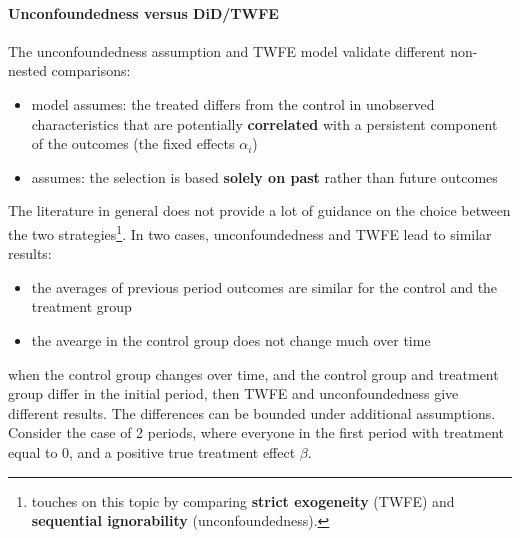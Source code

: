 \documentclass[twoside]{article}
\begin{document}
\paragraph{Unconfoundedness versus DiD/TWFE}
The unconfoundedness assumption and TWFE model validate different non-nested comparisons:
\begin{itemize}
    \item {} model assumes: the treated differs from the control in unobserved characteristics that are potentially \textbf{correlated} with a persistent component of the outcomes (the fixed effects $\alpha_i$)
    \item {} assumes: the selection is based \textbf{solely on past} rather than future outcomes
\end{itemize}
The literature in general does not provide a lot of guidance on the choice between the two strategies\footnote{\citet{xu2023causal} touches on this topic by comparing \textbf{strict exogeneity} (TWFE) and \textbf{sequential ignorability} (unconfoundedness).}.
In two cases, unconfoundedness and TWFE lead to similar results:
\begin{itemize}
    \item the averages of previous period outcomes are similar for the control and the treatment group 
    \item the avearge in the control group does not change much over time
\end{itemize}
when the control group changes over time, and the control group and treatment group differ in the initial period, then TWFE and unconfoundedness give different results. The differences can be bounded under additional assumptions. Consider the case of 2 periods, where everyone in the first period with treatment equal to $0$, and a positive true treatment effect $\beta$. 
\end{document}
